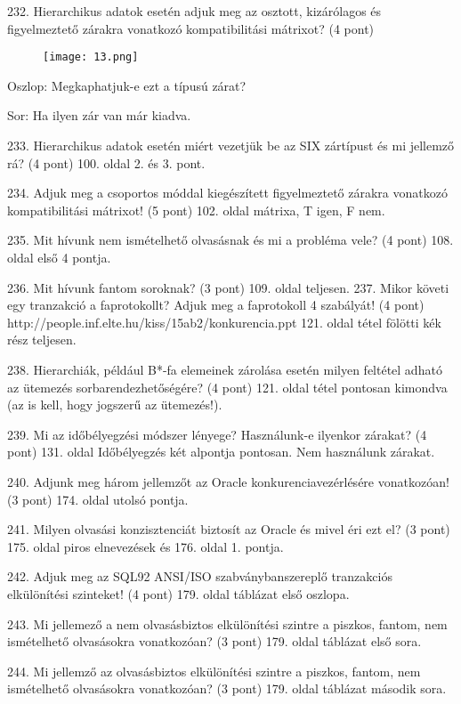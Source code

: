 \documentclass[a4paper,11.5pt, table]{article}
\begin{document}
232. Hierarchikus adatok esetén adjuk meg az osztott, kizárólagos és figyelmeztető zárakra vonatkozó kompatibilitási mátrixot? (4 pont)
	\begin{compactitem}
		\begin{figure}[h]
			\centering
			\texttt{[image: 13.png]}
		\end{figure}
		\item Oszlop: Megkaphatjuk-e ezt a típusú zárat?
		\item Sor: Ha ilyen zár van már kiadva.
	\end{compactitem}
		
233. Hierarchikus adatok esetén miért vezetjük be az SIX zártípust és mi jellemző rá? (4 pont)
 100. oldal 2. és 3. pont.
 
234. Adjuk meg a csoportos móddal kiegészített figyelmeztető zárakra vonatkozó kompatibilitási mátrixot! (5 pont)
 102. oldal mátrixa, T igen, F nem.

235. Mit hívunk nem ismételhető olvasásnak és mi a probléma vele? (4 pont)
  108. oldal első 4 pontja.

236. Mit hívunk fantom soroknak? (3 pont)
109. oldal teljesen.
237. Mikor követi egy tranzakció a faprotokollt? Adjuk meg a faprotokoll 4 szabályát! (4 pont)
http://people.inf.elte.hu/kiss/15ab2/konkurencia.ppt 121. oldal tétel fölötti kék rész teljesen.

238. Hierarchiák, például B*-fa elemeinek zárolása esetén milyen feltétel adható az ütemezés sorbarendezhetőségére? (4 pont)
 121. oldal tétel pontosan kimondva (az is kell, hogy jogszerű az ütemezés!).

239. Mi az időbélyegzési módszer lényege? Használunk-e ilyenkor zárakat? (4 pont)
 131. oldal Időbélyegzés két alpontja pontosan. Nem használunk zárakat.

240. Adjunk meg három jellemzőt az Oracle konkurenciavezérlésére vonatkozóan! (3 pont)
 174. oldal utolsó pontja.

241. Milyen olvasási konzisztenciát biztosít az Oracle és mivel éri ezt el? (3 pont)
 175. oldal piros elnevezések és 176. oldal 1. pontja.

242. Adjuk meg az SQL92 ANSI/ISO szabványbanszereplő tranzakciós elkülönítési szinteket! (4 pont)
 179. oldal táblázat első oszlopa.

243. Mi jellemező a nem olvasásbiztos elkülönítési szintre a piszkos, fantom, nem ismételhető olvasásokra vonatkozóan? (3 pont)
179. oldal táblázat első sora.

244. Mi jellemző az olvasásbiztos elkülönítési szintre a piszkos, fantom, nem ismételhető olvasásokra vonatkozóan? (3 pont)
179. oldal táblázat második sora.
\end{document}
